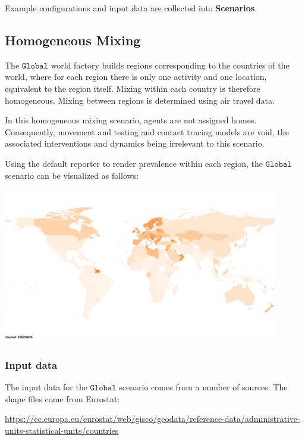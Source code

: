 \documentclass[10pt,letterpaper]{article}
\begin{document}
Example configurations and input data are collected into \textbf{Scenarios}.

\subsection{Homogeneous Mixing}

The $\texttt{Global}$ world factory builds regions corresponding to the countries of the world, where for each region there is only one activity and one location, equivalent to the region itself. Mixing within each country is therefore homogeneous. Mixing between regions is determined using air travel data.

In this homogeneous mixing scenario, agents are not assigned homes. Consequently, movement and testing and contact tracing models are void, the associated interventions and dynamics being irrelevant to this scenario.

Using the default reporter to render prevalence within each region, the $\texttt{Global}$ scenario can be visualized as follows:

\begin{center}
\includegraphics[width=0.9\textwidth]{homogeneous}
\end{center}

\subsubsection*{Input data}

The input data for the $\texttt{Global}$ scenario comes from a number of sources. The shape files come from Eurostat:

\begin{center}
\url{https://ec.europa.eu/eurostat/web/gisco/geodata/reference-data/administrative-units-statistical-units/countries}
\end{center}
\end{document}
